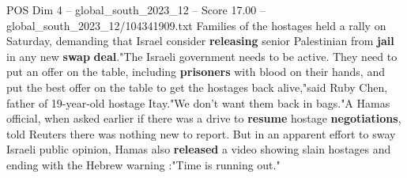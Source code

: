 \begin{textsample}{POS Dim 4 – global\_south\_2023\_12 – Score 17.00 – global\_south\_2023\_12/104341909.txt}
Families of the hostages held a rally on Saturday, demanding that Israel consider \textbf{releasing} senior Palestinian from \textbf{jail} in any new \textbf{swap} \textbf{deal}."The Israeli government needs to be active.
They need to put an offer on the table, including \textbf{prisoners} with blood on their hands, and put the best offer on the table to get the hostages back alive,"said Ruby Chen, father of 19-year-old hostage Itay."We don't want them back in bags."A Hamas official, when asked earlier if there was a drive to \textbf{resume} hostage \textbf{negotiations}, told Reuters there was nothing new to report.
But in an apparent effort to sway Israeli public opinion, Hamas also \textbf{released} a video showing slain hostages and ending with the Hebrew warning :"Time is running out."

\end{textsample}
